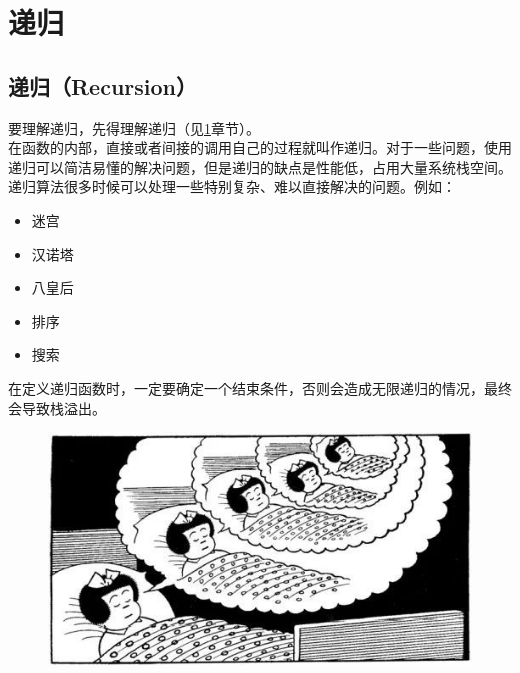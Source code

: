 \newpage

\section{递归} \label{recursive}

\subsection{递归（Recursion）}

要理解递归，先得理解递归（见\ref{recursive}章节）。\\

在函数的内部，直接或者间接的调用自己的过程就叫作递归。对于一些问题，使用递归可以简洁易懂的解决问题，但是递归的缺点是性能低，占用大量系统栈空间。\\

递归算法很多时候可以处理一些特别复杂、难以直接解决的问题。例如：

\begin{itemize}
	\item 迷宫
	\item 汉诺塔
	\item 八皇后
	\item 排序
	\item 搜索
\end{itemize}

在定义递归函数时，一定要确定一个结束条件，否则会造成无限递归的情况，最终会导致栈溢出。

\begin{figure}[H]
	\centering
	\includegraphics[scale=0.7]{img/C5/5-5/1.png}
\end{figure}

